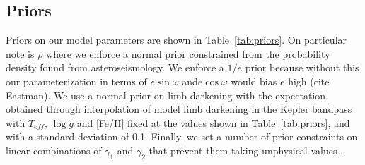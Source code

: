 \documentclass[apjl]{emulateapj}
\begin{document}


\subsection{Priors}
Priors on our model parameters are shown in Table~\ref{tab:priors}. On particular note is $\rho$ where we enforce a normal prior constrained from the probability density found from asteroseismology. We enforce a $1/e$ prior because without this our parameterization in terms of $e\sin{\omega}$ and$e\cos{\omega}$ would bias $e$ high (cite Eastman). We use a normal prior on limb darkening with the expectation obtained through interpolation of model limb darkening in the Kepler bandpass with $T_{eff}$, $\log{g}$ and [Fe/H] fixed at the values shown in Table~\ref{tab:priors}, and with a standard deviation of 0.1. Finally, we set a number of prior constraints on linear combinations of $\gamma_1$ and $\gamma_2$ that prevent them taking unphysical values \citep{burke08}.
\end{document}
